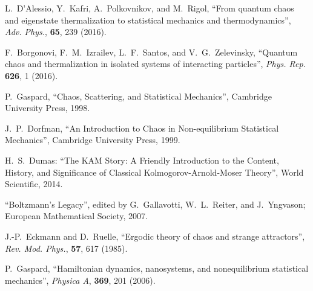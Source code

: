 \documentclass[a4paper, onecolumn]{revtex4-1}
\begin{document}
\begin{thebibliography}{1}


L.~D'Alessio, Y.~Kafri, A.~Polkovnikov, and M.~Rigol, 
``From quantum chaos and eigenstate thermalization to statistical mechanics and thermodynamics'', 
{\em Adv.
  Phys.}, {\bf 65}, 239 (2016).

F.~Borgonovi, F.~M.~Izrailev, L.~F.~Santos, and V.~G.~Zelevinsky,
``Quantum chaos and thermalization in isolated systems of interacting particles'', 
  {\em Phys. Rep.} {\bf 626}, 1 (2016).


P.~Gaspard, ``Chaos, Scattering, and Statistical Mechanics'', Cambridge University Press, 1998.

 J.~P.~Dorfman, ``An Introduction to Chaos in Non-equilibrium Statistical
  Mechanics'', Cambridge University Press, 1999.

 H.~S.~Dumas: ``The KAM Story: A Friendly Introduction to the Content,
History, and Significance of Classical Kolmogorov-Arnold-Moser Theory'', World Scientific, 2014. 

 ``Boltzmann's Legacy'', edited by G.~Gallavotti, W.~L.~Reiter, and
  J.~Yngvason; European Mathematical Society, 2007.

  J.-P.~Eckmann and D.~Ruelle,
  ``Ergodic theory of chaos and strange attractors'', 
  \emph{Rev. Mod. Phys.}, {\bf 57}, 617  (1985).

P.~Gaspard, 
``Hamiltonian dynamics, nanosystems, and nonequilibrium statistical mechanics'', 
{\em Physica A}, {\bf 369}, 201 (2006). 



\end{thebibliography}
\end{document}
